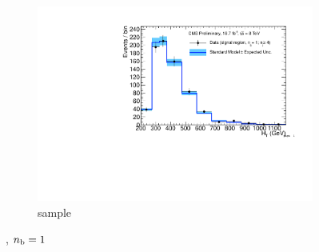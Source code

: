 \begin{figure}[h!]
\begin{subfigure}[b]{0.48\textwidth}
    \includegraphics[width=\textwidth,page=6]
    {Figs/results/v0/blueBand/bestFit_2012dev_RQcdZero_fZinvAll_1b_ge4j-12hp_smOnly}
    \caption{\gj sample}
  \end{subfigure}
  \caption{\njhigh, $n_{\text{b}} = 1$}
  \label{fig:blue_fits_1b_ge4j}
\end{figure}

